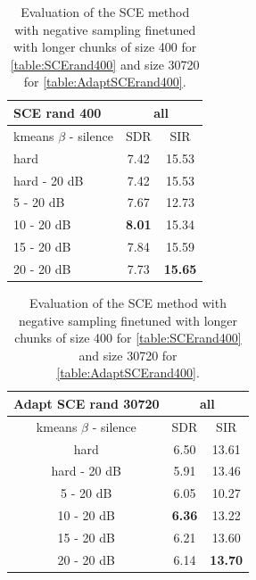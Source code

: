 \documentclass[master, tikz, final,11pt, dvipdfmx]{iscs-thesis}
\begin{document}
\begin{table}[h!]
\begin{subtable}{.5\linewidth}
\centering
\begin{tabular}{l|c|c}
SCE rand 400 & \multicolumn{2}{c}{all} \\  
\hline 
kmeans $\beta$ - silence & SDR & SIR  \\ 
\hline
hard  & 7.42 & 15.53  \\ 
hard - 20 dB  & 7.42 & 15.53 \\
\hline
\hline
5 - 20 dB  & 7.67 & 12.73 \\ 
10 - 20 dB  & \cellcolor{green}\textbf{8.01} & \cellcolor{green}15.34 \\ 
15 - 20 dB & 7.84 & 15.59  \\ 
20 - 20 dB & 7.73 & \textbf{15.65}  \\ 
\end{tabular}
\caption{Using spectrograms chunks of size 100}
\label{table:SCErand400}
\end{subtable}%
\begin{subtable}{.5\linewidth}
\centering
\begin{tabular}{c|c|c}
Adapt SCE rand 30720 & \multicolumn{2}{c}{all} \\  
\hline 
kmeans $\beta$ - silence & SDR & SIR  \\ 
\hline
hard  & 6.50 & 13.61  \\ 
hard - 20 dB  & 5.91 & 13.46 \\
\hline
\hline
5 - 20 dB  & 6.05 & 10.27 \\ 
10 - 20 dB  & \cellcolor{green}\textbf{6.36} & \cellcolor{green}13.22 \\ 
15 - 20 dB & 6.21 & 13.60  \\ 
20 - 20 dB & 6.14 & \textbf{13.70}  \\ 
\end{tabular}
\caption{Using audio chunks of size 30720 with the Adaptive layer}
\label{table:AdaptSCErand400}
\end{subtable}
\caption[Evaluation of the SCE method with negative sampling finetuned with longer chunks]{Evaluation of the SCE method with negative sampling finetuned with longer chunks of size 400 for \autoref{table:SCErand400} and size 30720 for \autoref{table:AdaptSCErand400}.}
\end{table}
\end{document}
